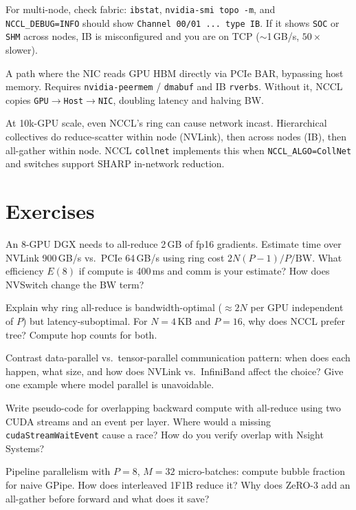 For multi-node, check fabric: \texttt{ibstat}, \texttt{nvidia-smi topo -m}, and \texttt{NCCL\_DEBUG=INFO} should show \texttt{Channel 00/01 ... type IB}. If it shows \texttt{SOC} or \texttt{SHM} across nodes, IB is misconfigured and you are on TCP ($\sim$1\,GB/s, $50\times$ slower).

\begin{definition}
A path where the NIC reads GPU HBM directly via PCIe BAR, bypassing host memory. Requires \texttt{nvidia-peermem} / \texttt{dmabuf} and IB \texttt{rverbs}. Without it, NCCL copies \texttt{GPU$\to$Host$\to$NIC}, doubling latency and halving BW.
\end{definition}

At 10k-GPU scale, even NCCL's ring can cause network incast. Hierarchical collectives do reduce-scatter within node (NVLink), then across nodes (IB), then all-gather within node. NCCL \texttt{collnet} implements this when \texttt{NCCL\_ALGO=CollNet} and switches support SHARP in-network reduction.

\section{Exercises}
\begin{exercise}
An 8-GPU DGX needs to all-reduce 2\,GB of fp16 gradients. Estimate time over NVLink 900\,GB/s vs.\ PCIe 64\,GB/s using ring cost $2N(P-1)/P / \text{BW}$. What efficiency $E(8)$ if compute is 400\,ms and comm is your estimate? How does NVSwitch change the BW term?
\end{exercise}
\begin{exercise}
Explain why ring all-reduce is bandwidth-optimal ($\approx 2N$ per GPU independent of $P$) but latency-suboptimal. For $N=4$\,KB and $P=16$, why does NCCL prefer tree? Compute hop counts for both.
\end{exercise}
\begin{exercise}
Contrast data-parallel vs.\ tensor-parallel communication pattern: when does each happen, what size, and how does NVLink vs.\ InfiniBand affect the choice? Give one example where model parallel is unavoidable.
\end{exercise}
\begin{exercise}
Write pseudo-code for overlapping backward compute with all-reduce using two CUDA streams and an event per layer. Where would a missing \texttt{cudaStreamWaitEvent} cause a race? How do you verify overlap with Nsight Systems?
\end{exercise}
\begin{exercise}
Pipeline parallelism with $P=8$, $M=32$ micro-batches: compute bubble fraction for naive GPipe. How does interleaved 1F1B reduce it? Why does ZeRO-3 add an all-gather before forward and what does it save?
\end{exercise}

